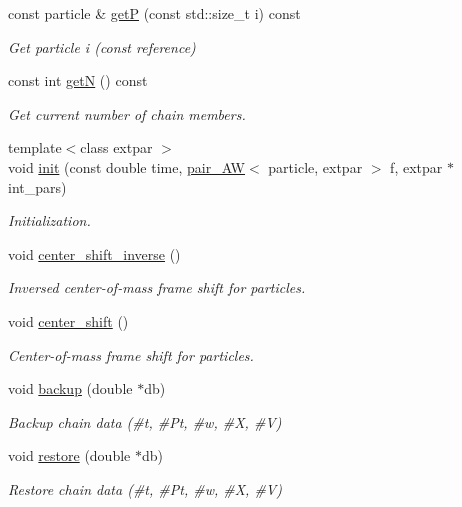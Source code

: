 \begin{DoxyCompactItemize}
const particle \& \hyperlink{classARC_1_1chain_a5ac5ec54e8431a95d383ad9dba75002c}{getP} (const std\+::size\+\_\+t i) const 
\begin{DoxyCompactList}\small\item\em Get particle i (const reference) \end{DoxyCompactList}\item 
const int \hyperlink{classARC_1_1chain_a33f1da5cef018ad18921e3887cb68424}{getN} () const 
\begin{DoxyCompactList}\small\item\em Get current number of chain members. \end{DoxyCompactList}\item 
{\footnotesize template$<$class extpar $>$ }\\void \hyperlink{classARC_1_1chain_a0ad6c0c1d80133d8a4d62bc4679cef80}{init} (const double time, \hyperlink{namespaceARC_a270b4c77765cacf073a5ef5f928f1d63}{pair\+\_\+\+AW}$<$ particle, extpar $>$ f, extpar $\ast$int\+\_\+pars)
\begin{DoxyCompactList}\small\item\em Initialization. \end{DoxyCompactList}\item 
void \hyperlink{classARC_1_1chain_a52edc1843550578f5be5590b7403ef97}{center\+\_\+shift\+\_\+inverse} ()
\begin{DoxyCompactList}\small\item\em Inversed center-\/of-\/mass frame shift for particles. \end{DoxyCompactList}\item 
void \hyperlink{classARC_1_1chain_a68ae268afb418455bfdd6e8101b3b4eb}{center\+\_\+shift} ()
\begin{DoxyCompactList}\small\item\em Center-\/of-\/mass frame shift for particles. \end{DoxyCompactList}\item 
void \hyperlink{classARC_1_1chain_a587009b6c6db0490c0f335aba732d77a}{backup} (double $\ast$db)
\begin{DoxyCompactList}\small\item\em Backup chain data (\#t, \#\+Pt, \#w, \#X, \#V) \end{DoxyCompactList}\item 
void \hyperlink{classARC_1_1chain_a2e7873b3a50ba9276d9a7595cb1d768d}{restore} (double $\ast$db)
\begin{DoxyCompactList}\small\item\em Restore chain data (\#t, \#\+Pt, \#w, \#X, \#V) \end{DoxyCompactList}\item 

\end{DoxyCompactItemize}
